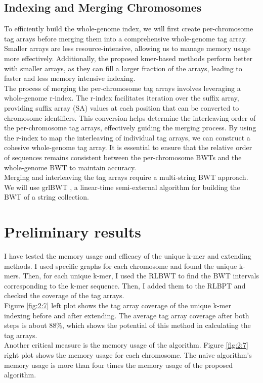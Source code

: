 \documentclass[11pt]{ucthesis}
\begin{document}
\subsection{Indexing and Merging Chromosomes}
To efficiently build the whole-genome index, we will first create per-chromosome tag arrays before merging them into a comprehensive whole-genome tag array. Smaller arrays are less resource-intensive, allowing us to manage memory usage more effectively. Additionally, the proposed kmer-based methods perform better with smaller arrays, as they can fill a larger fraction of the arrays, leading to faster and less memory intensive indexing. \\
The process of merging the per-chromosome tag arrays involves leveraging a whole-genome r-index. The r-index facilitates iteration over the suffix array, providing suffix array (SA) values at each position that can be converted to chromosome identifiers. This conversion helps determine the interleaving order of the per-chromosome tag arrays, effectively guiding the merging process. By using the r-index to map the interleaving of individual tag arrays, we can construct a cohesive whole-genome tag array. It is essential to ensure that the relative order of sequences remains consistent between the per-chromosome BWTs and the whole-genome BWT to maintain accuracy. \\
Merging and interleaving the tag arrays require a multi-string BWT approach. We will use grlBWT \cite{diaz2023efficient}, a linear-time semi-external algorithm for building the BWT of a string collection.



\section{Preliminary results}
I have tested the memory usage and efficacy of the unique k-mer and extending methods. I used specific graphs for each chromosome and found the unique k-mers. Then, for each unique k-mer, I used the RLBWT to find the BWT intervals corresponding to the k-mer sequence. Then, I added them to the RLBPT and checked the coverage of the tag arrays. \\
Figure \ref{fig:2:7} left plot shows the tag array coverage of the unique k-mer indexing before and after extending. The average tag array coverage after both steps is about 88\%, which shows the potential of this method in calculating the tag arrays. \\
Another critical measure is the memory usage of the algorithm. Figure \ref{fig:2:7} right plot shows the memory usage for each chromosome. The naive algorithm's memory usage is more than four times the memory usage of the proposed algorithm. 
\end{document}
